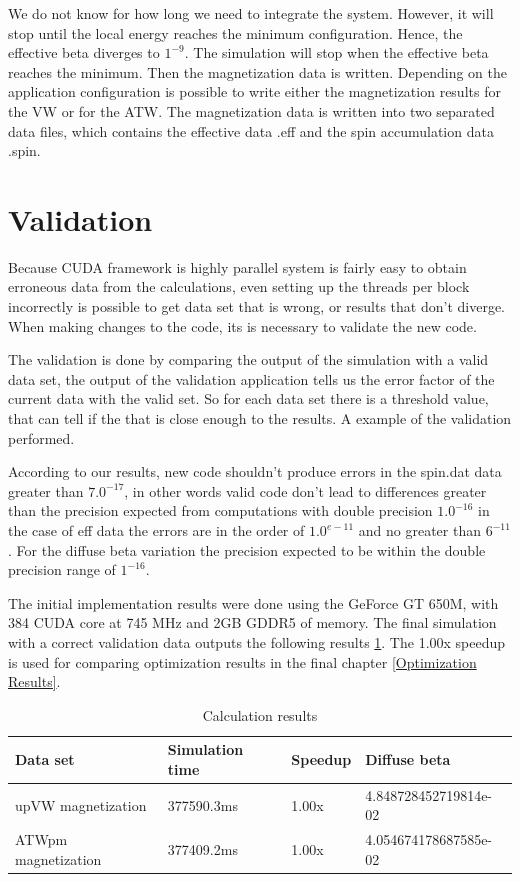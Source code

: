 We do not know for how long we need to integrate the system. However, it will stop until the local energy reaches the minimum configuration. Hence, the effective beta diverges to $1^{-9}$. The simulation will stop when the effective beta reaches the minimum. Then the magnetization data is written. Depending on the application configuration is possible to write either the magnetization results for the VW or for the ATW. The magnetization data is written into two separated data files, which contains the effective data .eff and the spin accumulation data .spin.

\section{Validation}

Because CUDA framework is highly parallel system is fairly easy to obtain erroneous data from the calculations, even setting up the threads per block incorrectly is possible to get data set that is wrong, or results that don't diverge. When making changes to the code, its is necessary to validate the new code.

The validation is done by comparing the output of the simulation with a valid data set, the output of the validation application tells us the error factor of the current data with the valid set. So for each data set there is a threshold value, that can tell if the that is close enough to the results. A example of the validation performed.

According to our results, new code shouldn't produce errors in the spin.dat data greater than $7.0^{-17}$, in other words valid code don't lead to differences greater than the precision expected from computations with double precision $1.0^{-16}$ in the case of eff data the errors are in the order of $1.0^{e-11}$ and no greater than $6^{-11}$. For the diffuse beta variation the precision expected to be within the double precision range of $1^{-16}$. 


The initial implementation results were done using the GeForce GT 650M, with 384 CUDA core at 745 MHz and 2GB GDDR5 of memory. The final simulation with a correct validation data outputs the following results \ref{tab:results}. The 1.00x speedup is used for comparing optimization results in the final chapter \ref{Optimization Results}.

\begin{table}[h]
\centering
\begin{tabular}{| l | l | l | l |}
\hline
Data set & Simulation time & Speedup & Diffuse beta  \\
\hline
upVW magnetization & 377590.3ms & 1.00x & 4.848728452719814e-02 \\
\hline
ATWpm magnetization & 377409.2ms & 1.00x & 4.054674178687585e-02 \\
\hline
\end{tabular}
\caption{Calculation results}
\label{tab:results}
\end{table}


